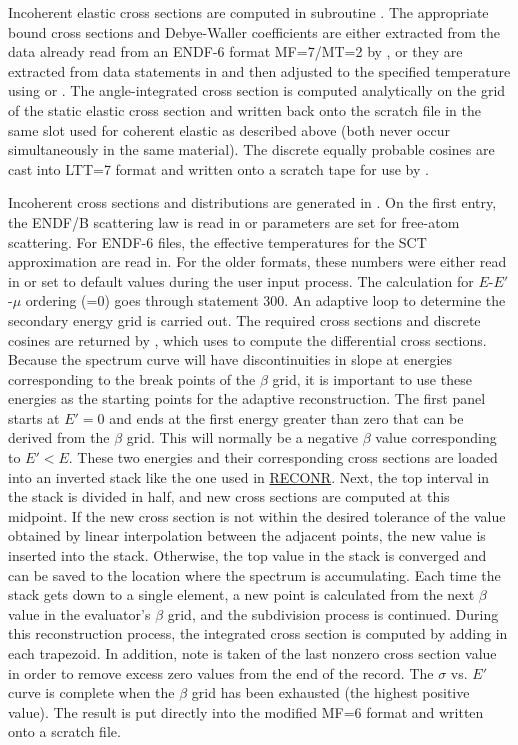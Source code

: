 Incoherent elastic cross sections are computed in subroutine
.  The appropriate bound cross sections
and Debye-Waller coefficients are either extracted from the data already
read from an ENDF-6 format MF=7/MT=2 by , or they are
extracted from data statements in 
and then adjusted to the specified temperature using
 or .
The angle-integrated cross section is computed analytically on the grid
of the static elastic cross section and written back onto the
 scratch file in the same slot used for coherent
elastic as described above (both never occur simultaneously in the
same material).  The discrete equally probable cosines are cast
into LTT=7 format and written onto a scratch tape for use by
.

Incoherent cross sections and distributions are generated in
.  On the first entry,
the ENDF/B scattering law is read in or parameters are set for
free-atom scattering.  For ENDF-6 files, the effective temperatures
for the SCT approximation are read in.  For the older formats, these
numbers were either read in or set to default values during the user
input process.  The calculation for $E$-$E'$-$\mu$ ordering (=0)
goes through statement 300. An adaptive loop to determine the
secondary energy grid is carried out.  The required cross sections and
discrete cosines are returned by ,
which uses  to compute the
differential cross sections.  Because the spectrum curve will
have discontinuities in slope at energies corresponding to the break points
of the $\beta$ grid, it is important to use these energies as the starting
points for the adaptive reconstruction.  The first panel starts at $E'=0$
and ends at the first energy greater than zero that can be derived from
the $\beta$ grid.  This will normally be a negative $\beta$ value
corresponding to $E'{<}E$.  These two energies and their corresponding
cross sections are loaded into an inverted stack like the one used in
\hyperlink{sRECONRhy}{RECONR}.  Next, the top interval in the
stack is divided in half, and new
cross sections are computed at this midpoint.  If the new cross section
is not within the desired tolerance of the value obtained by linear
interpolation between the adjacent points, the new value is inserted into
the stack.  Otherwise, the top value in the stack is converged and can be
saved to the location where the spectrum is accumulating.  Each time the
stack gets down to a single element, a new point is calculated from the
next $\beta$ value in the evaluator's $\beta$ grid, and the subdivision
process is continued.  During this reconstruction process, the integrated
cross section is computed by adding in each trapezoid.  In addition, note
is taken of the last nonzero cross section value in order to remove excess
zero values from the end of the record.  The $\sigma$ vs. $E'$ curve is
complete when the $\beta$ grid has been exhausted (the highest positive
value).  The result is put directly into the modified MF=6 format and
written onto a scratch file.

